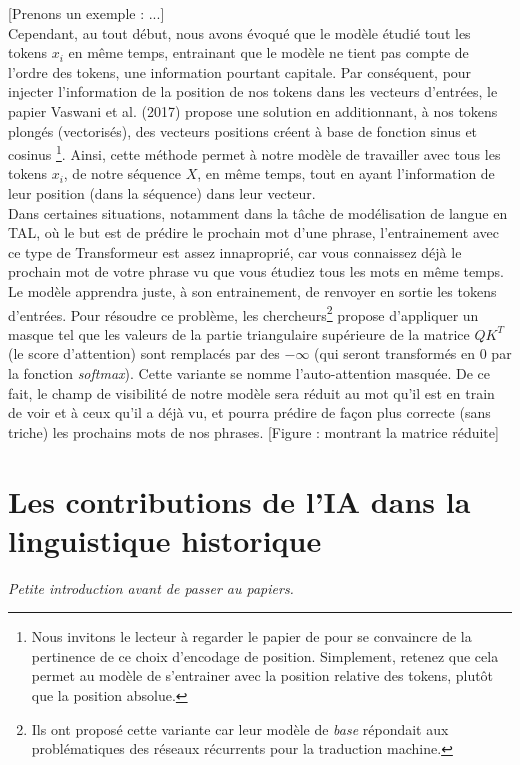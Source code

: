 \documentclass[12pt, french, twoside]{report}
\begin{document}
[Prenons un exemple : ...]\\

Cependant, au tout début, nous avons évoqué que le modèle étudié tout les tokens $x_i$ en même temps, entrainant que le modèle ne tient pas compte de l'ordre des tokens, une information pourtant capitale. Par conséquent, pour injecter l'information de la position de nos tokens dans les vecteurs d'entrées, le papier Vaswani et al. (2017)\citep{transformer} propose une solution en additionnant, à nos tokens plongés (vectorisés), des vecteurs positions créent à base de fonction sinus et cosinus \footnote{Nous invitons le lecteur à regarder le papier de \cite{transformer} pour se convaincre de la pertinence de ce choix d'encodage de position. Simplement, retenez que cela permet au modèle de s'entrainer avec la position relative des tokens, plutôt que la position absolue.}. Ainsi, cette méthode permet à notre modèle de travailler avec tous les tokens $x_i$, de notre séquence $X$, en même temps, tout en ayant l'information de leur position (dans la séquence) dans leur vecteur.\\

Dans certaines situations, notamment dans la tâche de modélisation de langue en TAL, où le but est de prédire le prochain mot d'une phrase, l'entrainement avec ce type de Transformeur est assez innaproprié, car vous connaissez déjà le prochain mot de votre phrase vu que vous étudiez tous les mots en même temps. Le modèle apprendra juste, à son entrainement, de renvoyer en sortie les tokens d'entrées. Pour résoudre ce problème, les chercheurs\footnote{Ils ont proposé cette variante car leur modèle de \textit{base} répondait aux problématiques des réseaux récurrents pour la traduction machine.} propose d'appliquer un masque tel que les valeurs de la partie triangulaire supérieure de la matrice $QK^T$ (le score d'attention) sont remplacés par des $-\infty$ (qui seront transformés en 0 par la fonction \textit{softmax}). Cette variante se nomme l'auto-attention masquée. De ce fait, le champ de visibilité de notre modèle sera réduit au mot qu'il est en train de voir et à ceux qu'il a déjà vu, et pourra prédire de façon plus correcte (sans triche) les prochains mots de nos phrases. [Figure : montrant la matrice réduite]

\chapter{Les contributions de l'IA dans la linguistique historique}
\textit{Petite introduction avant de passer au papiers.}
\end{document}
